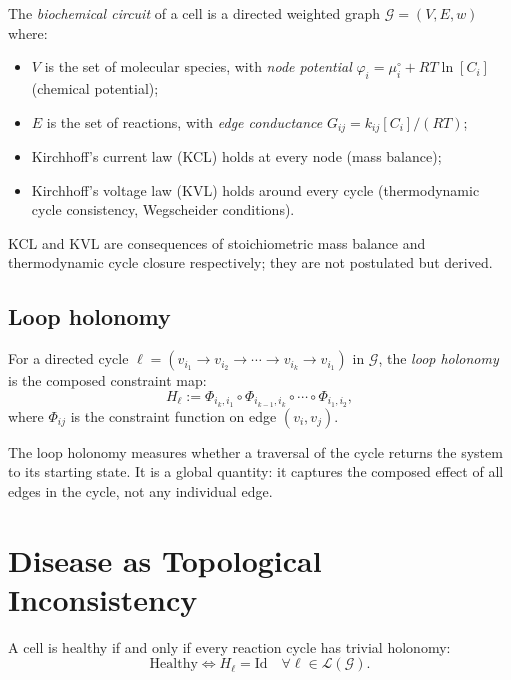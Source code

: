 \documentclass[twocolumn,11pt,a4paper]{article}
\newcommand{\Gcond}{\mathcal{G}}
\newcommand{\HolL}{H_\ell}
\begin{document}
\begin{definition}\label{def:circuit}
The \emph{biochemical circuit} of a cell is a directed weighted graph
$\Gcond = (V, E, w)$ where:
\begin{itemize}[leftmargin=*,nosep]
\item $V$ is the set of molecular species, with
      \emph{node potential}
      $\varphi_i = \mu_i^\circ + RT\ln[C_i]$ (chemical potential);
\item $E$ is the set of reactions, with
      \emph{edge conductance}
      $G_{ij} = k_{ij}[C_i]/(RT)$;
\item Kirchhoff's current law (KCL) holds at every node (mass balance);
\item Kirchhoff's voltage law (KVL) holds around every cycle
      (thermodynamic cycle consistency, Wegscheider conditions).
\end{itemize}
\end{definition}

KCL and KVL are consequences of stoichiometric mass balance and
thermodynamic cycle closure respectively; they are not postulated but derived.

\subsection{Loop holonomy}

\begin{definition}\label{def:holonomy}
For a directed cycle $\ell = (v_{i_1}\to v_{i_2}\to\cdots\to v_{i_k}
\to v_{i_1})$ in $\Gcond$, the \emph{loop holonomy} is the composed
constraint map:
\[
\HolL := \Phi_{i_k,i_1}\circ\Phi_{i_{k-1},i_k}\circ\cdots\circ\Phi_{i_1,i_2},
\]
where $\Phi_{ij}$ is the constraint function on edge $(v_i, v_j)$.
\end{definition}

The loop holonomy measures whether a traversal of the cycle returns
the system to its starting state. It is a global quantity: it captures
the composed effect of all edges in the cycle, not any individual edge.

\section{Disease as Topological Inconsistency}
\label{sec:disease}

\begin{theorem}\label{thm:health-consistency}
A cell is healthy if and only if every reaction cycle has trivial holonomy:
\[
\text{Healthy} \iff \HolL = \mathrm{Id} \quad\forall \ell \in \mathcal{L}(\Gcond).
\]
\end{theorem}
\end{document}
